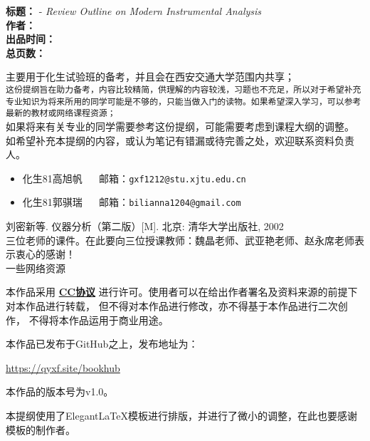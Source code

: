 \newpage
\hypersetup{pageanchor=true}

\begin{tcolorbox}[title={\bfseries 作品信息}]
	\makeatletter
	 \textbf{标题：}\@title{} - \textit{Review Outline on Modern Instrumental Analysis}\\
	 \textbf{作者：}\@author\\
	 \textbf{出品时间：}\@date\\
	 \textbf{总页数：}\pageref{LastPage}
	\makeatother
\end{tcolorbox}

\begin{tcolorbox}[title={\bfseries 关于本提纲用途的说明}]
 主要用于化生试验班的备考，并且会在西安交通大学范围内共享；\\
 \texttt{这份提纲旨在助力备考，内容比较精简，供理解的内容较浅，习题也不充足，所以对于希望补充专业知识为将来所用的同学可能是不够的，只能当做入门的读物。如果希望深入学习，可以参考最新的教材或网络课程资源；}\\
 如果将来有关专业的同学需要参考这份提纲，可能需要考虑到课程大纲的调整。
 如希望补充本提纲的内容，或认为笔记有错漏或待完善之处，欢迎联系资料负责人。
\begin{itemize}
	\item 化生81\hspace{1em}高旭帆\hspace{1em} \faEnvelopeOpen ~~ 邮箱：\texttt{gxf1212@stu.xjtu.edu.cn}
	\item 化生81\hspace{1em}郭骐瑞\hspace{1em} \faEnvelopeOpen ~~ 邮箱：\texttt{bilianna1204@gmail.com}
\end{itemize}
\end{tcolorbox}

\begin{tcolorbox}[title={\bfseries 主要参考资料}]
 刘密新等. 仪器分析（第二版）[M]. 北京: 清华大学出版社, 2002\\
 三位老师的课件。在此要向三位授课教师：魏晶老师、武亚艳老师、赵永席老师表示衷心的感谢！\\
 一些网络资源
\end{tcolorbox}


\begin{tcolorbox}[title={\bfseries 许可证说明}]
\centerline{}
本作品采用 \href{https://creativecommons.org/licenses/by-nc-nd/4.0/}{\textbf{CC协议}}
进行许可。使用者可以在给出作者署名及资料来源的前提下对本作品进行转载，
但不得对本作品进行修改，亦不得基于本作品进行二次创作，
不得将本作品运用于商业用途。
\end{tcolorbox}

\begin{tcolorbox}
	本作品已发布于GitHub之上，发布地址为：\\
	\centerline{\url{https://qyxf.site/bookhub}}
	本作品的版本号为\textsf{v1.0}。
	
	本提纲使用了Elegant\LaTeX 模板进行排版，并进行了微小的调整，在此也要感谢模板的制作者。
\end{tcolorbox}




